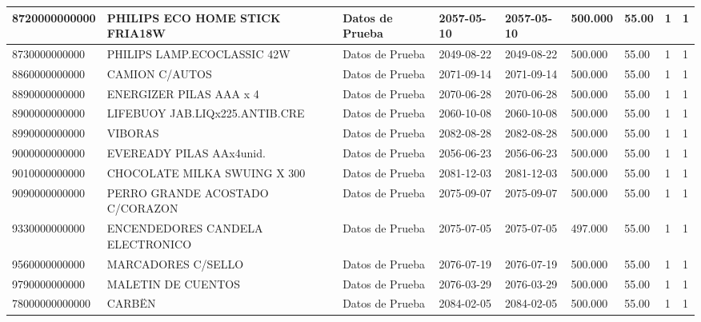 \documentclass[a4paper,12pt]{article}
\begin{document}
\begin{landscape}
\begin{longtable}{|p{4cm}|p{2.5cm}|p{2.5cm}|p{1.8cm}|p{1.8cm}|p{1cm}|p{1cm}|p{3cm}|p{3cm}||}
8720000000000 & PHILIPS ECO HOME STICK FRIA18W & Datos de Prueba & 2057-05-10 & 2057-05-10 & 500.000 & 55.00 & 1 & 1 \\ \hline 
8730000000000 & PHILIPS LAMP.ECOCLASSIC 42W & Datos de Prueba & 2049-08-22 & 2049-08-22 & 500.000 & 55.00 & 1 & 1 \\ \hline 
8860000000000 & CAMION C/AUTOS & Datos de Prueba & 2071-09-14 & 2071-09-14 & 500.000 & 55.00 & 1 & 1 \\ \hline 
8890000000000 & ENERGIZER PILAS AAA x 4 & Datos de Prueba & 2070-06-28 & 2070-06-28 & 500.000 & 55.00 & 1 & 1 \\ \hline 
8900000000000 & LIFEBUOY JAB.LIQx225.ANTIB.CRE & Datos de Prueba & 2060-10-08 & 2060-10-08 & 500.000 & 55.00 & 1 & 1 \\ \hline 
8990000000000 & VIBORAS & Datos de Prueba & 2082-08-28 & 2082-08-28 & 500.000 & 55.00 & 1 & 1 \\ \hline 
9000000000000 & EVEREADY PILAS AAx4unid. & Datos de Prueba & 2056-06-23 & 2056-06-23 & 500.000 & 55.00 & 1 & 1 \\ \hline 
9010000000000 & CHOCOLATE MILKA SWUING X 300 & Datos de Prueba & 2081-12-03 & 2081-12-03 & 500.000 & 55.00 & 1 & 1 \\ \hline 
9090000000000 & PERRO GRANDE ACOSTADO C/CORAZON & Datos de Prueba & 2075-09-07 & 2075-09-07 & 500.000 & 55.00 & 1 & 1 \\ \hline 
9330000000000 & ENCENDEDORES CANDELA ELECTRONICO & Datos de Prueba & 2075-07-05 & 2075-07-05 & 497.000 & 55.00 & 1 & 1 \\ \hline 
9560000000000 & MARCADORES C/SELLO & Datos de Prueba & 2076-07-19 & 2076-07-19 & 500.000 & 55.00 & 1 & 1 \\ \hline 
9790000000000 & MALETIN DE CUENTOS & Datos de Prueba & 2076-03-29 & 2076-03-29 & 500.000 & 55.00 & 1 & 1 \\ \hline 
78000000000000 & CARBËN & Datos de Prueba & 2084-02-05 & 2084-02-05 & 500.000 & 55.00 & 1 & 1 \\ \hline 
\end{longtable}
\thispagestyle{empty}
\end{landscape}
\end{document}
